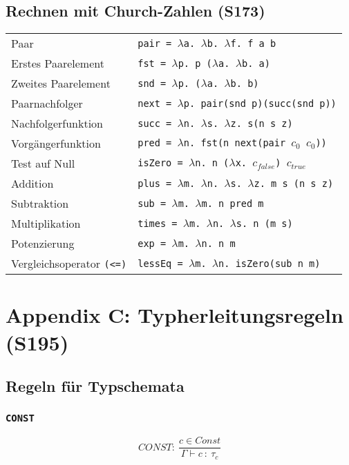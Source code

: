 \subsection{Rechnen mit Church-Zahlen (S173)}
\begin{table}[H]
\begin{tabularx}{\textwidth}{l|X}
	Paar & \texttt{pair = \(\lambda\)a. \(\lambda\)b. \(\lambda\)f. f a b} \\
	Erstes Paarelement & \texttt{fst = \(\lambda\)p. p (\(\lambda\)a. \(\lambda\)b. a)} \\
	Zweites Paarelement & \texttt{snd = \(\lambda\)p. (\(\lambda\)a. \(\lambda\)b. b)} \\
	Paarnachfolger & \texttt{next = \(\lambda\)p. pair(snd p)(succ(snd p))} \\
	Nachfolgerfunktion & \texttt{succ = \(\lambda\)n. \(\lambda\)s. \(\lambda\)z. s(n s z)} \\
	Vorgängerfunktion & \texttt{pred = \(\lambda\)n. fst(n next(pair \(c_0\) \(c_0\)))} \\
	Test auf Null & \texttt{isZero = \(\lambda\)n. n (\(\lambda\)x. \(c_{false}\)) \(c_{true}\)} \\
	Addition & \texttt{plus = \(\lambda\)m. \(\lambda\)n. \(\lambda\)s. \(\lambda\)z. m s (n s z)} \\
	Subtraktion & \texttt{sub = \(\lambda\)m. \(\lambda\)m. n pred m} \\
	Multiplikation & \texttt{times = \(\lambda\)m. \(\lambda\)n. \(\lambda\)s. n (m s)} \\
	Potenzierung & \texttt{exp = \(\lambda\)m. \(\lambda\)n. n m} \\
	Vergleichsoperator \texttt{(<=)} & \texttt{lessEq = \(\lambda\)m. \(\lambda\)n. isZero(sub n m)} \\
\end{tabularx}
\end{table}



\section{Appendix C: Typherleitungsregeln (S195)}

\subsection{Regeln für Typschemata}

\subsubsection{\texttt{CONST}}
\[CONST:~\frac{c \in Const}{\Gamma \vdash c~:~\tau_c}\]

